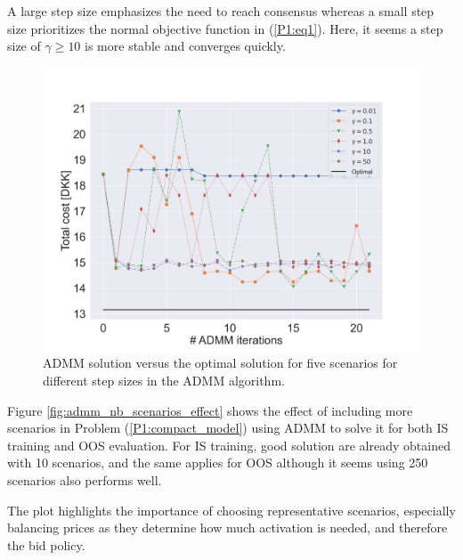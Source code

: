 A large step size emphasizes the need to reach consensus whereas a small step size prioritizes the normal objective function in (\ref{P1:eq1}). Here, it seems a step size of $\gamma \geq 10$ is more stable and converges quickly.

\begin{figure}[!t]
    \centering
    \includegraphics[width=\columnwidth]{../figures/admm_vs_normal_solution.png}
    \caption{ADMM solution versus the optimal solution for five scenarios for different step sizes in the ADMM algorithm.}
    \label{fig:admm_vs_normal_solution}
\end{figure}

Figure \ref{fig:admm_nb_scenarios_effect} shows the effect of including more scenarios in Problem (\ref{P1:compact_model}) using ADMM to solve it for both IS training and OOS evaluation. For IS training, good solution are already obtained with 10 scenarios, and the same applies for OOS although it seems using 250 scenarios also performs well.

The plot highlights the importance of choosing representative scenarios, especially balancing prices as they determine how much activation is needed, and therefore the bid policy.

